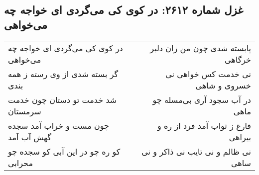 \begin{center}
\section*{غزل شماره ۲۶۱۲: در کوی کی می‌گردی ای خواجه چه می‌خواهی}
\label{sec:2612}
\begin{longtable}{l p{0.5cm} r}
در کوی کی می‌گردی ای خواجه چه می‌خواهی
&&
پابسته شدی چون من زان دلبر خرگاهی
\\
گر بسته شدی از وی رسته ز همه بندی
&&
نی خدمت کس خواهی نی خسروی و شاهی
\\
شد خدمت تو دستان چون خدمت سرمستان
&&
در آب سجود آری بی‌مسله چو ماهی
\\
چون مست و خراب آمد سجده گهش آب آمد
&&
فارغ ز ثواب آمد فرد از ره و بیراهی
\\
کو ره چو در این آبی کو سجده چو محرابی
&&
نی ظالم و نی تایب نی ذاکر و نی ساهی
\\
\end{longtable}
\end{center}
